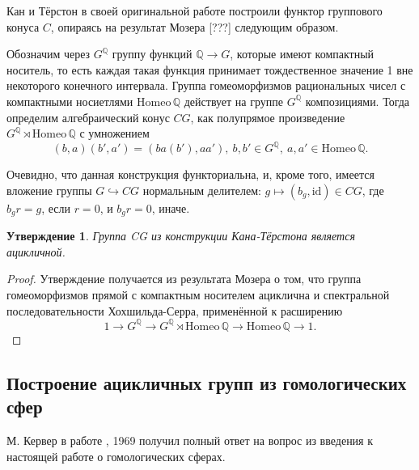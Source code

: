\documentclass[14pt, dvipsnames]{extarticle}
\newtheorem{statement}{Утверждение}
\theoremstyle{definition}
\theoremstyle{remark}
\newtheorem*{comment}{Замечание}
\begin{document}
Кан и Тёрстон в своей оригинальной работе \cite{Kan} построили функтор группового конуса $C$, опираясь на результат Мозера [???] следующим образом.

Обозначим через $G^{\mathbb{Q}}$ группу функций $\mathbb{Q}\to G$, которые имеют компактный носитель, то есть каждая такая функция принимает тождественное значение 1 вне некоторого конечного интервала. Группа гомеоморфизмов рациональных чисел с компактными носиетлями $\mathrm{Homeo}\, \mathbb{Q}$ действует на группе $G^{\mathbb{Q}}$ композициями. Тогда определим алгебраический конус $CG$, как полупрямое произведение $G^{\mathbb{Q}}\rtimes \mathrm{Homeo}\, \mathbb{Q}$ с умножением $$(b, a)(b', a')=(ba(b'), aa'),\ b, b'\in G^{\mathbb{Q}},\ a, a'\in \mathrm{Homeo}\, \mathbb{Q}.$$

Очевидно, что данная конструкция функториальна, и, кроме того, имеется вложение группы $G\hookrightarrow CG$ нормальным делителем: $g\mapsto (b_g, \mathrm{id})\in CG$, где $b_gr=g$, если $r=0$, и $b_gr=0$, иначе.

\begin{statement}
Группа CG из конструкции Кана-Тёрстона является ацикличной.
\end{statement}

\begin{proof}
Утверждение получается из результата Мозера о том, что группа гомеоморфизмов прямой с компактным носителем ациклична и спектральной последовательности Хохшильда-Серра, применённой к расширению $$1\to G^{\mathbb{Q}}\to G^{\mathbb{Q}}\rtimes \mathrm{Homeo}\, \mathbb{Q}\to \mathrm{Homeo}\, \mathbb{Q}\to 1.$$
\end{proof}

 \subsection{Построение ацикличных групп из гомологических сфер}
 
 М. Кервер в работе \cite{Kervaire}, 1969 получил полный ответ на вопрос из введения к настоящей работе о гомологических сферах.
\end{document}
